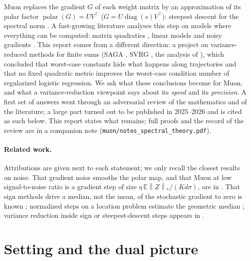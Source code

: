 \documentclass[11pt]{article}
\newcommand{\E}{\mathbb{E}}
\newcommand{\nnuc}[1]{\left\|#1\right\|_{*}}
\newcommand{\diag}{\operatorname{diag}}
\newcommand{\polar}{\operatorname{polar}}
\begin{document}
Muon \cite{jordan2024muon} replaces the gradient $G$ of each weight matrix by an approximation of its polar factor
$\polar(G)=UV^\top$ ($G=U\diag(s)V^\top$): steepest descent for the spectral norm
\cite{carlson2015stochastic,bernstein2024old}. A fast-growing literature analyses this step on models where everything
can be computed: matrix quadratics \cite{shulgin2026quadratic,davis2025spectral}, linear models
\cite{vasudeva2025muon} and noisy gradients \cite{xie2026muon,chen2026when,paquette2026phases,do2026muon}. This
report comes from a different direction: a project on variance-reduced methods for finite sums (SAGA
\cite{defazio2014saga}, SVRG \cite{johnson2013accelerating}, the analysis of \cite{bach2024learning}), which concluded
that worst-case constants hide what happens along trajectories and that no fixed quadratic metric improves the
worst-case condition number of regularized logistic regression. We ask what these conclusions become for Muon, and
what a variance-reduction viewpoint says about its \emph{speed} and its \emph{precision}. A first set of answers went
through an adversarial review of the mathematics and of the literature; a large part turned out to be published in
2025--2026 and is cited as such below. This report states what remains; full proofs and the record of the review are
in a companion note (\texttt{muon/notes\_spectral\_theory.pdf}).

\paragraph{Related work.} Attributions are given next to each statement; we only recall the closest results on
noise. That gradient noise smooths the polar map, and that Muon at low signal-to-noise ratio is a gradient step of
size $\eta\,\E\nnuc Z/(Kd\sigma)$, are in \cite{xie2026muon,chen2026when,paquette2026phases}. That sign methods drive
a median, not the mean, of the stochastic gradient to zero is known \cite{chen2020distributed}; normalized steps on a
location problem estimate the geometric median \cite{cardot2013efficient}; variance reduction inside sign or
steepest-descent steps appears in \cite{chzhen2023signsvrg,li2026implicit}.

\section{Setting and the dual picture}\label{sec:setting}
\end{document}
